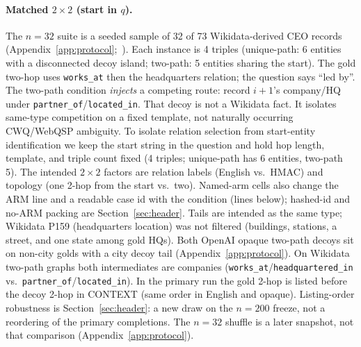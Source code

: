 \documentclass{article}
\begin{document}
\paragraph{Matched $2{\times}2$ (start in $q$).}
\label{par:fact2x2}
The $n{=}32$ suite is a seeded sample of 32 of 73 Wikidata-derived CEO
records (Appendix~\ref{app:protocol};~\citealp{vrandecic2014wikidata}).
Each instance is 4 triples (unique-path: 6 entities with a disconnected
decoy island; two-path: 5 entities sharing the start). The gold two-hop
uses \texttt{works\_at} then the headquarters relation; the question says
``led by''.
The two-path condition \emph{injects} a competing route: record $i{+}1$'s
company/HQ under \texttt{partner\_of}/\texttt{located\_in}.
That decoy is not a Wikidata fact. It isolates same-type competition on a
fixed template, not naturally occurring CWQ/WebQSP ambiguity.
To isolate relation selection from start-entity identification we keep the
start string in the question and hold hop length, template, and triple count
fixed (4 triples; unique-path has 6 entities, two-path 5). The intended $2{\times}2$ factors are relation labels
(English vs.\ HMAC) and topology (one 2-hop from the start vs.\ two).
Named-arm cells also change the ARM line and a readable case id with the
condition (lines below); hashed-id and no-ARM packing are
Section~\ref{sec:header}.
Tails are intended as the same type; Wikidata P159 (headquarters location)
was not filtered
(buildings, stations, a street, and one state among gold HQs).
Both OpenAI opaque two-path decoys sit on non-city golds with a city decoy
tail (Appendix~\ref{app:protocol}).
On Wikidata two-path graphs both intermediates are companies
(\texttt{works\_at}/\texttt{headquartered\_in} vs.\
\texttt{partner\_of}/\texttt{located\_in}).
In the primary run the gold 2-hop is listed before the decoy 2-hop in
CONTEXT (same order in English and opaque). Listing-order robustness is
Section~\ref{sec:header}: a new draw on the $n{=}200$ freeze, not a
reordering of the primary completions.
The $n{=}32$ shuffle is a later snapshot, not that comparison
(Appendix~\ref{app:protocol}).
\end{document}
